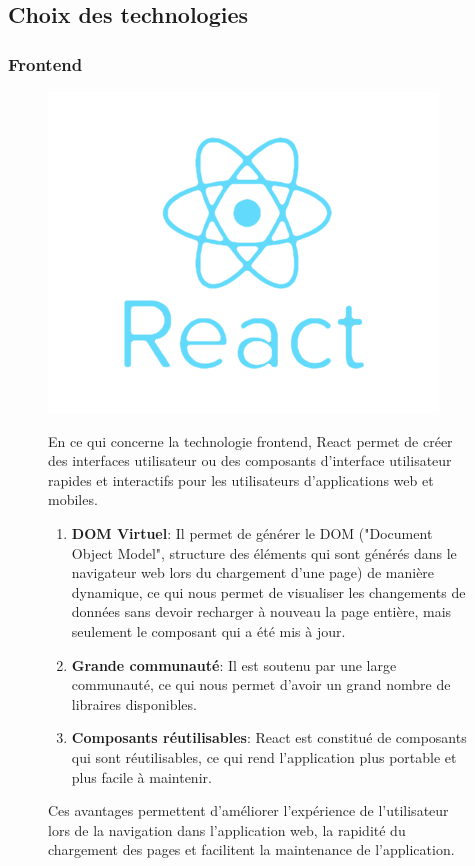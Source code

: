 \subsection{Choix des technologies}

\subsubsection{Frontend}
\begin{figure}[H]
  \begin{minipage}{.3\textwidth}
    \includegraphics[width=0.75\linewidth]{img/react.png}
  \end{minipage}
  \begin{minipage}{.7\textwidth}
    
    En ce qui concerne la technologie frontend, React permet de créer des interfaces utilisateur ou des composants d'interface utilisateur rapides et interactifs pour les utilisateurs d'applications web et mobiles.
    \begin{enumerate}
      \item \textbf{DOM Virtuel}: Il permet de générer le DOM ("Document Object Model", structure des éléments qui sont générés dans le navigateur web lors du chargement d'une page) de manière dynamique, ce qui nous permet de visualiser les changements de données sans devoir recharger à nouveau la page entière, mais seulement le composant qui a été mis à jour.
      \item \textbf{Grande communauté}: Il est soutenu par une large communauté, ce qui nous permet d'avoir un grand nombre de libraires disponibles.
      \item \textbf{Composants réutilisables}: React est constitué de composants qui sont réutilisables, ce qui rend l'application plus portable et plus facile à maintenir.
    \end{enumerate}
    Ces avantages permettent d'améliorer l'expérience de l'utilisateur lors de la navigation dans l'application web, la rapidité du chargement des pages et facilitent la maintenance de l'application.
  \end{minipage}
\end{figure}

